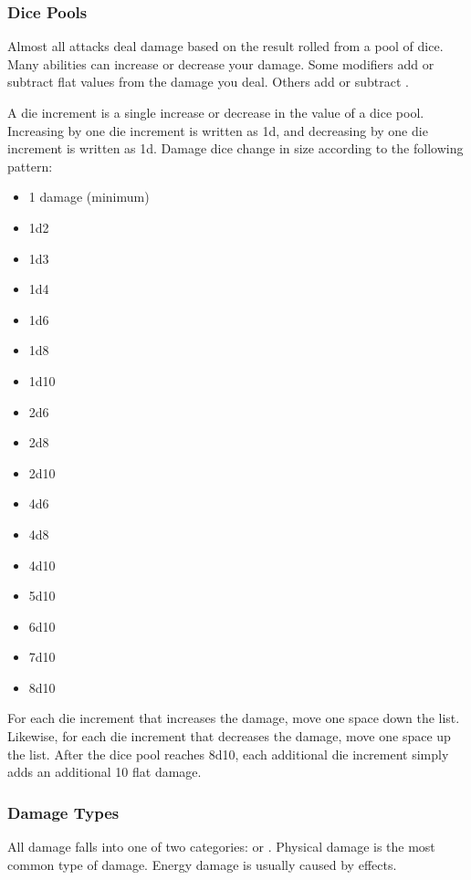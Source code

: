         \subsubsection{Dice Pools}\label{Dice Pools}
            Almost all attacks deal damage based on the result rolled from a pool of dice.
            Many abilities can increase or decrease your damage.
            Some modifiers add or subtract flat values from the damage you deal.
            Others add or subtract .

            A die increment is a single increase or decrease in the value of a dice pool.
            Increasing by one die increment is written as \plus1d, and decreasing by one die increment is written as \minus1d.
            Damage dice change in size according to the following pattern:
            \begin{itemize}
                \item 1 damage (minimum)
                \item 1d2
                \item 1d3
                \item 1d4
                \item 1d6
                \item 1d8
                \item 1d10
                \item 2d6
                \item 2d8
                \item 2d10
                \item 4d6
                \item 4d8
                \item 4d10
                \item 5d10
                \item 6d10
                \item 7d10
                \item 8d10
            \end{itemize}

        For each die increment that increases the damage, move one space down the list.
        Likewise, for each die increment that decreases the damage, move one space up the list.
        After the dice pool reaches 8d10, each additional die increment simply adds an additional 10 flat damage.

        \subsubsection{Damage Types}\label{Damage Types}
            All damage falls into one of two categories:  or .
            Physical damage is the most common type of damage.
            Energy damage is usually caused by  effects.

